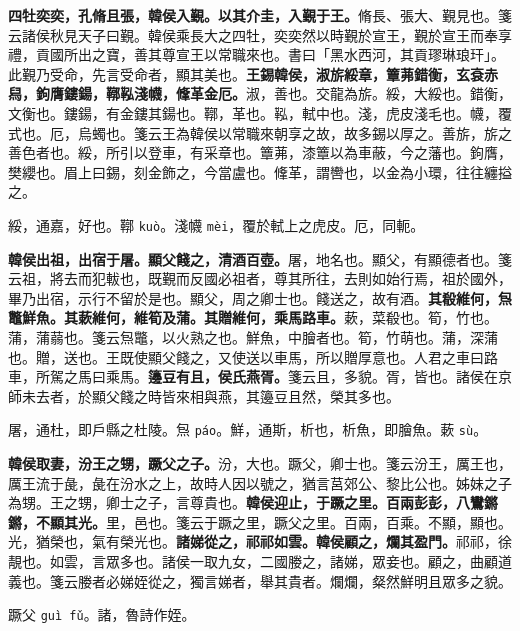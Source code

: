 \textbf{四牡奕奕，孔脩且張，韓侯入覲。以其介圭，入覲于王。}{\footnotesize 脩長、張大、覲見也。箋云諸侯秋見天子曰覲。韓侯乘長大之四牡，奕奕然以時覲於宣王，覲於宣王而奉享禮，貢國所出之寶，善其尊宣王以常職來也。書曰「黑水西河，其貢璆琳琅玕」。此覲乃受命，先言受命者，顯其美也。}\textbf{王錫韓侯，淑旂綏章，簟茀錯衡，玄袞赤舄，鉤膺鏤鍚，鞹鞃淺幭，鞗革金厄。}{\footnotesize 淑，善也。交龍為旂。綏，大綏也。錯衡，文衡也。鏤鍚，有金鏤其鍚也。鞹，革也。鞃，軾中也。淺，虎皮淺毛也。幭，覆式也。厄，烏蠋也。箋云王為韓侯以常職來朝享之故，故多錫以厚之。善旂，旂之善色者也。綏，所引以登車，有采章也。簟茀，漆簟以為車蔽，今之藩也。鉤膺，樊纓也。眉上曰錫，刻金飾之，今當盧也。鞗革，謂轡也，以金為小環，往往纏搤之。}

\begin{quoting}綏，通嘉，好也。鞹 \texttt{kuò}。淺幭 \texttt{mèi}，覆於軾上之虎皮。厄，同軛。\end{quoting}

\textbf{韓侯出祖，出宿于屠。顯父餞之，清酒百壺。}{\footnotesize 屠，地名也。顯父，有顯德者也。箋云祖，將去而犯軷也，既覲而反國必祖者，尊其所往，去則如始行焉，祖於國外，畢乃出宿，示行不留於是也。顯父，周之卿士也。餞送之，故有酒。}\textbf{其殽維何，炰鼈鮮魚。其蔌維何，維筍及蒲。其贈維何，乘馬路車。}{\footnotesize 蔌，菜殽也。筍，竹也。蒲，蒲蒻也。箋云炰鼈，以火熟之也。鮮魚，中膾者也。筍，竹萌也。蒲，深蒲也。贈，送也。王既使顯父餞之，又使送以車馬，所以贈厚意也。人君之車曰路車，所駕之馬曰乘馬。}\textbf{籩豆有且，侯氏燕胥。}{\footnotesize 箋云且，多貌。胥，皆也。諸侯在京師未去者，於顯父餞之時皆來相與燕，其籩豆且然，榮其多也。}

\begin{quoting}屠，通杜，即戶縣之杜陵。炰 \texttt{páo}。鮮，通斯，析也，析魚，即膾魚。蔌 \texttt{sù}。\end{quoting}

\textbf{韓侯取妻，汾王之甥，蹶父之子。}{\footnotesize 汾，大也。蹶父，卿士也。箋云汾王，厲王也，厲王流于彘，彘在汾水之上，故時人因以號之，猶言莒郊公、黎比公也。姊妹之子為甥。王之甥，卿士之子，言尊貴也。}\textbf{韓侯迎止，于蹶之里。百兩彭彭，八鸞鏘鏘，不顯其光。}{\footnotesize 里，邑也。箋云于蹶之里，蹶父之里。百兩，百乘。不顯，顯也。光，猶榮也，氣有榮光也。}\textbf{諸娣從之，祁祁如雲。韓侯顧之，爛其盈門。}{\footnotesize 祁祁，徐靚也。如雲，言眾多也。諸侯一取九女，二國媵之，諸娣，眾妾也。顧之，曲顧道義也。箋云媵者必娣姪從之，獨言娣者，舉其貴者。爛爛，粲然鮮明且眾多之貌。}

\begin{quoting}蹶父 \texttt{guì fǔ}。諸，魯詩作姪。\end{quoting}

